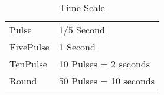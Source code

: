 \begin{table}[h]
\caption{Time Scale}
\centering
	\begin{tabular}{ll} \hline
	Pulse      & 1/5 Second	\\
	FivePulse  & 1 Second   	\\
	TenPulse   & 10 Pulses = 2 seconds	\\
	Round      & 50 Pulses = 10 seconds	\\  \hline
	\end{tabular}
\end{table}
